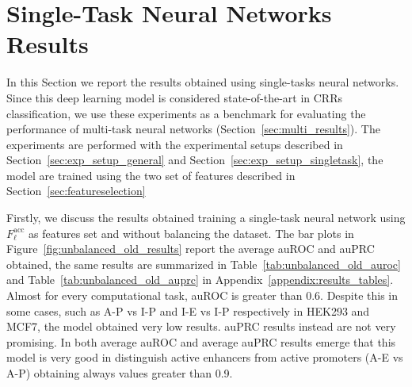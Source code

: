 \section{Single-Task Neural Networks Results}
\label{sec:single_results}
In this Section we report the results obtained using single-tasks neural networks. Since this deep learning model is considered state-of-the-art in CRRs classification, we use these experiments as a benchmark for evaluating the performance of multi-task neural networks (Section~\ref{sec:multi_results}). The experiments are performed with the experimental setups described in Section~\ref{sec:exp_setup_general} and Section~\ref{sec:exp_setup_singletask}, the model are trained using the two set of features described in Section~\ref{sec:featureselection} 

Firstly, we discuss the results obtained training a single-task neural network using $F_\ell^{\textrm{acc}}$ as features set and without balancing the dataset. The bar plots in Figure~\ref{fig:unbalanced_old_results} report the average auROC and auPRC obtained, the same results are summarized in Table~\ref{tab:unbalanced_old_auroc} and Table~\ref{tab:unbalanced_old_auprc} in Appendix~\ref{appendix:results_tables}. Almost for every computational task, auROC is greater than 0.6. Despite this in some cases, such as A-P vs I-P and I-E vs I-P respectively in HEK293 and MCF7, the model obtained very low results. auPRC results instead are not very promising. In both average auROC and average auPRC results emerge that this model is very good in distinguish active enhancers from active promoters (A-E vs A-P) obtaining always values greater than 0.9.
